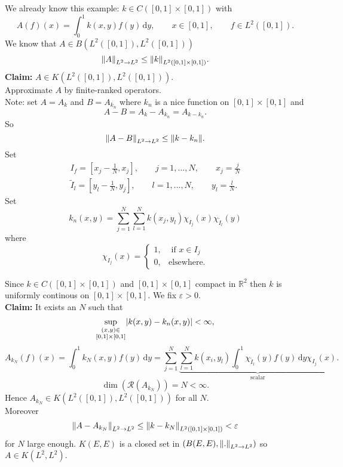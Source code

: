 \begin{beispiel}
	We already know this example: $k \in C([0,1] \times [0,1])$ with
	\[
		A(f)(x) = \int_{0}^{1} k(x,y)f(y) \,\mathrm{d}y, \qquad x \in [0,1], \qquad f \in L^2([0,1]).
	\]
	We know that $A \in B(L^2([0,1]), L^2([0,1]))$ 
	\[
		\norm{A}_{L^2 \to L^2} \leq \norm{k}_{L^2([0,1] \times [0,1])}.
	\]
	\textbf{Claim:} \text{    }$A \in K(L^2([0,1]),L^2([0,1]))$. \\
	Approximate $A$ by finite-ranked operators. \\
	Note: set $A = A_k$ and $B = A_{k_n}$ where $k_n$ is a nice function on $[0,1] \times [0,1]$ and
	\[
		A-B = A_k - A_{k_n} = A_{k-k_n}.
	\]
	So \[
		\norm{A-B}_{L^2 \to L^2} \leq \norm{k - k_n}.
	\]
	Set \begin{align*}
		I_f = [x_j - \frac{1}{N}, x_j], \qquad j = 1, \dots, N, \qquad x_j = \frac{j}{N} \\
		\tilde I_l =[y_l - \frac{1}{N}, y_j], \qquad l = 1, \dots, N, \qquad y_l = \frac{l}{N}. 
	\end{align*}
	Set \[
		k_n(x,y) = \sum_{j=1}^{N} \sum_{l=1}^{N} k(x_j,y_l) \chi_{I_j}(x) \chi_{\tilde I_l}(y)
	\]
	where \[
		\chi_{I_j}(x) = \begin{cases}
			1, &\text{ if }x \in I_j\\
			0, &\text{elsewhere}.
		\end{cases}
	\]
\end{beispiel}
Since $k \in C([0,1] \times [0,1])$ and $[0,1] \times [0,1]$ compact in $\mathbb{R}^2$ then $k$ is uniformly continous on $[0,1] \times [0,1]$. We fix $\varepsilon >0$. \\
\textbf{Claim:} \text{    }It exists an $N$ such that
\[
	\sup_{\substack{(x,y) \in  \\ [0,1] \times [0,1]}} \lvert k(x,y)- k_n(x,y)\rvert < \infty,
\]
\[
	A_{k_N}(f)(x) = \int_{0}^{1} k_N(x,y) f(y) \,\mathrm{d}y = \sum_{j=1}^{N} \underset{\text{scalar}}{\underbrace{\sum_{l=1}^{N} k(x_i,y_l) \int_{0}^{1} \chi_{\tilde I_l}(y) f(y) \,\mathrm{d}y \chi_{I_j}(x)}}.
\]
\[
	\dim(\mathcal{R}(A_{k_N})) = N < \infty.
\]
Hence $A_{k_N} \in K(L^2([0,1]), L^2([0,1]))$ for all $N$. \\
Moreover 
\[
	\norm{A-A_{k_N}}_{L^2 \to L^2} \leq \norm{k - k_N}_{L^2([0,1] \times [0,1])} < \varepsilon
\] 
for $N$ large enough. $K(E,E)$ is a closed set in $(B(E,E), \norm{.}_{L^2 \to L^2})$ so $A \in K(L^2,L^2)$.

